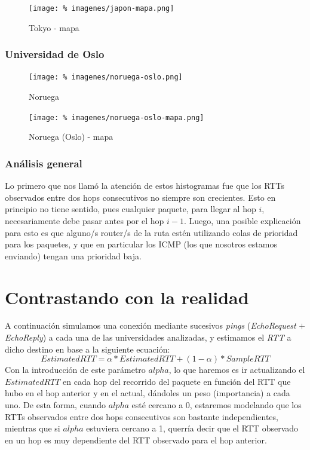 \documentclass[final,inline,a4paper,narroweqnarray]{ieee}
\begin{document}
\begin{figure}[ht]\begin{center}
   \texttt{[image: \%
    imagenes/japon-mapa.png]}
    \caption{Tokyo - mapa}
    \label{tokyo-mapa}
\end{center}\end{figure}

\subsubsection{Universidad de Oslo}
\begin{figure}[ht]\begin{center}
   \texttt{[image: \%
    imagenes/noruega-oslo.png]}
    \caption{Noruega}
    \label{noruega-rtt-zrtt}
\end{center}\end{figure}

\begin{figure}[ht]\begin{center}
   \texttt{[image: \%
    imagenes/noruega-oslo-mapa.png]}
    \caption{Noruega (Oslo) - mapa}
    \label{noruega-mapa}
\end{center}\end{figure}

\subsubsection{Análisis general}

Lo primero que nos llamó la atención de estos histogramas fue que los RTTs
observados entre dos hops consecutivos no siempre son crecientes. Esto en
principio no tiene sentido, pues cualquier paquete, para llegar al hop $i$,
necesariamente debe pasar antes por el hop $i-1$. Luego, una posible explicación
para esto es que alguno/s router/s de la ruta estén utilizando colas de
prioridad para los paquetes, y que en particular los ICMP (los que nosotros
estamos enviando) tengan una prioridad baja.

\section{Contrastando con la realidad}

A continuación simulamos una conexión mediante sucesivos \emph{pings}
(\emph{EchoRequest} $+$ \emph{EchoReply}) a cada una de las universidades
analizadas, y estimamos el \emph{RTT} a dicho destino en base a la siguiente
ecuación:
\[
EstimatedRTT = \alpha * EstimatedRTT + (1 - \alpha) * SampleRTT
\]
Con la introducción de este parámetro $alpha$, lo que haremos es ir actualizando
el $EstimatedRTT$ en cada hop del recorrido del paquete en función del RTT que
hubo en el hop anterior y en el actual, dándoles un peso (importancia) a cada
uno. De esta forma, cuando $alpha$ esté cercano a 0, estaremos modelando que los
RTTs observados entre dos hops consecutivos son bastante independientes,
mientras que si $alpha$ estuviera cercano a 1, querría decir que el RTT
observado en un hop es muy dependiente del RTT observado para el hop anterior.
\end{document}
